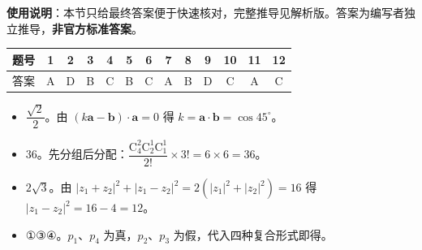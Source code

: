 
\begin{gknotice}
\textbf{使用说明}：本节只给最终答案便于快速核对，完整推导见解析版。答案为编写者独立推导，\textbf{非官方标准答案}。
\end{gknotice}

\begin{center}\begin{tabular}{ccccccccccccc}
\toprule
题号 & 1 & 2 & 3 & 4 & 5 & 6 & 7 & 8 & 9 & 10 & 11 & 12 \\
\midrule
答案 & A & D & B & C & B & C & A & B & D & C & A & C \\
\bottomrule
\end{tabular}\end{center}

\begin{itemize}[leftmargin=2.6em]
  \item[\textbf{13.}] $\dfrac{\sqrt2}2$。由 $(k\boldsymbol a-\boldsymbol b)\cdot\boldsymbol a=0$ 得 $k=\boldsymbol a\cdot\boldsymbol b=\cos45^\circ$。
  \item[\textbf{14.}] $36$。先分组后分配：$\dfrac{\mathrm C_4^2\mathrm C_2^1\mathrm C_1^1}{2!}\times3!=6\times6=36$。
  \item[\textbf{15.}] $2\sqrt3$。由 $|z_1+z_2|^2+|z_1-z_2|^2=2(|z_1|^2+|z_2|^2)=16$ 得 $|z_1-z_2|^2=16-4=12$。
  \item[\textbf{16.}] ①③④。$p_1$、$p_4$ 为真，$p_2$、$p_3$ 为假，代入四种复合形式即得。
\end{itemize}

